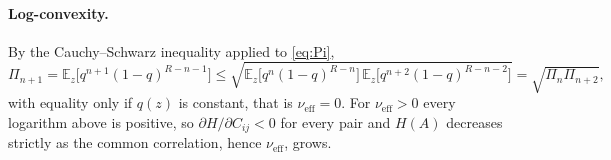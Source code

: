 \documentclass[11pt,a4paper]{article}
\newcommand{\EE}{\mathbb{E}}
\newcommand{\nueff}{\nu_{\mathrm{eff}}}
\begin{document}
\paragraph{Log-convexity.} By the Cauchy--Schwarz inequality applied to \eqref{eq:Pi},
\begin{equation*}
  \Pi_{n+1}=\EE_z\big[q^{n+1}(1-q)^{R-n-1}\big]
  \le\sqrt{\EE_z\big[q^n(1-q)^{R-n}\big]\,\EE_z\big[q^{n+2}(1-q)^{R-n-2}\big]}
  =\sqrt{\Pi_n\Pi_{n+2}},
\end{equation*}
with equality only if $q(z)$ is constant, that is $\nueff=0$. For $\nueff>0$ every
logarithm above is positive, so $\partial H/\partial C_{ij}<0$ for every pair and $H(A)$
decreases strictly as the common correlation, hence $\nueff$, grows.
\end{document}
